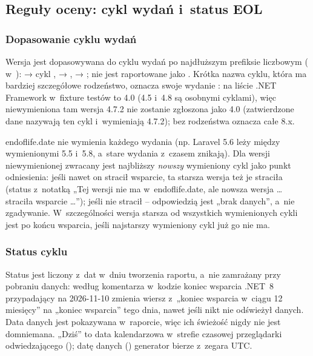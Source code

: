 \subsection{Reguły oceny: cykl wydań i~status EOL}\label{sec:risk-scan-reguly}

\subsubsection{Dopasowanie cyklu wydań}

Wersja jest dopasowywana do cyklu wydań po najdłuższym prefiksie liczbowym
( w~):  → cykl ,
 → ,  → ;  nie jest
raportowane jako . Krótka nazwa cyklu, która ma bardziej szczegółowe
rodzeństwo, oznacza swoje wydanie : na liście .NET Framework w~fixture testów
 to 4.0 (4.5 i~4.8 są osobnymi cyklami), więc niewymieniona tam wersja 4.7.2 nie
zostanie zgłoszona jako 4.0 (zatwierdzone dane nazywają ten cykl  i~wymieniają
4.7.2); bez rodzeństwa  oznacza całe 8.x.

endoflife.date nie wymienia każdego wydania (np. Laravel 5.6 leży między wymienionymi 5.5
i~5.8, a~stare wydania z~czasem znikają). Dla wersji niewymienionej zwracany jest najbliższy
\emph{nowszy} wymieniony cykl jako punkt odniesienia: jeśli nawet on stracił wsparcie, ta
starsza wersja też je straciła (status  z~notatką „Tej wersji nie ma
w~endoflife.date, ale nowsza wersja … straciła wsparcie …”); jeśli nie stracił -- odpowiedzią
jest „brak danych”, a~nie zgadywanie. W~szczególności wersja starsza od wszystkich
wymienionych cykli jest po końcu wsparcia, jeśli najstarszy wymieniony cykl już go nie ma.

\subsubsection{Status cyklu}

Status jest liczony z~dat w~dniu tworzenia raportu, a~nie zamrażany przy pobraniu danych:
według komentarza w~kodzie koniec wsparcia .NET~8 przypadający na 2026-11-10 zmienia wiersz
z~„koniec wsparcia w~ciągu 12 miesięcy” na „koniec wsparcia” tego dnia, nawet jeśli nikt nie
odświeżył danych. Data danych jest pokazywana w~raporcie, więc ich świeżość nigdy nie jest
domniemana. „Dziś” to data kalendarzowa w~strefie czasowej przeglądarki odwiedzającego
(); datę danych () generator bierze z~zegara UTC.

